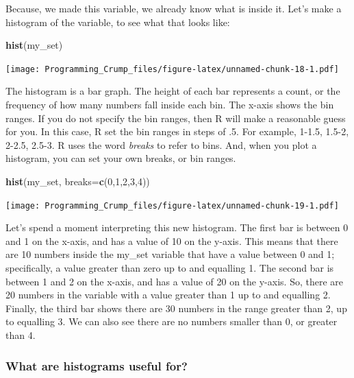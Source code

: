 \documentclass[]{book}
\newenvironment{Shaded}{\begin{snugshade}}{\end{snugshade}}
\newcommand{\KeywordTok}[1]{\textcolor[rgb]{0.13,0.29,0.53}{\textbf{{#1}}}}
\newcommand{\DataTypeTok}[1]{\textcolor[rgb]{0.13,0.29,0.53}{{#1}}}
\newcommand{\DecValTok}[1]{\textcolor[rgb]{0.00,0.00,0.81}{{#1}}}
\newcommand{\NormalTok}[1]{{#1}}
\theoremstyle{definition}
\theoremstyle{definition}
\theoremstyle{definition}
\theoremstyle{remark}
\begin{document}
Because, we made this variable, we already know what is inside it. Let's
make a histogram of the variable, to see what that looks like:

\begin{Shaded}
\begin{Highlighting}[]
\KeywordTok{hist}\NormalTok{(my_set)}
\end{Highlighting}
\end{Shaded}

\texttt{[image: Programming\_Crump\_files/figure-latex/unnamed-chunk-18-1.pdf]}

The histogram is a bar graph. The height of each bar represents a count,
or the frequency of how many numbers fall inside each bin. The x-axis
shows the bin ranges. If you do not specify the bin ranges, then R will
make a reasonable guess for you. In this case, R set the bin ranges in
steps of .5. For example, 1-1.5, 1.5-2, 2-2.5, 2.5-3. R uses the word
\emph{breaks} to refer to bins. And, when you plot a histogram, you can
set your own breaks, or bin ranges.

\begin{Shaded}
\begin{Highlighting}[]
\KeywordTok{hist}\NormalTok{(my_set, }\DataTypeTok{breaks=}\KeywordTok{c}\NormalTok{(}\DecValTok{0}\NormalTok{,}\DecValTok{1}\NormalTok{,}\DecValTok{2}\NormalTok{,}\DecValTok{3}\NormalTok{,}\DecValTok{4}\NormalTok{))}
\end{Highlighting}
\end{Shaded}

\texttt{[image: Programming\_Crump\_files/figure-latex/unnamed-chunk-19-1.pdf]}

Let's spend a moment interpreting this new histogram. The first bar is
between 0 and 1 on the x-axis, and has a value of 10 on the y-axis. This
means that there are 10 numbers inside the my\_set variable that have a
value between 0 and 1; specifically, a value greater than zero up to and
equalling 1. The second bar is between 1 and 2 on the x-axis, and has a
value of 20 on the y-axis. So, there are 20 numbers in the variable with
a value greater than 1 up to and equalling 2. Finally, the third bar
shows there are 30 numbers in the range greater than 2, up to equalling
3. We can also see there are no numbers smaller than 0, or greater than
4.

\subsubsection{What are histograms useful
for?}\label{what-are-histograms-useful-for}
\end{document}
